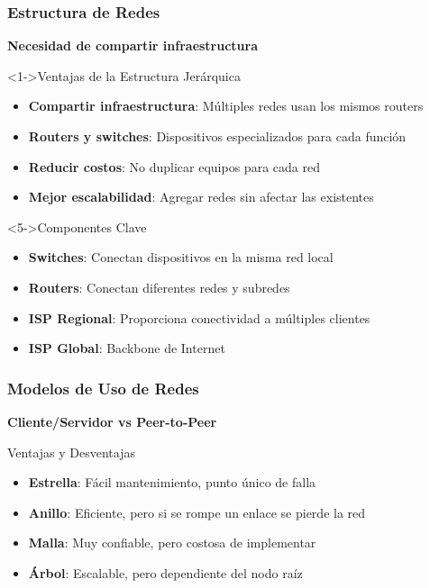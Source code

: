 \documentclass[aspectratio=169]{beamer}
\begin{document}
\begin{frame}
\frametitle{Estructura de Redes}

\begin{center}
\Large \textbf{Necesidad de compartir infraestructura}
\end{center}

\begin{block}<1->{Ventajas de la Estructura Jerárquica}
\begin{itemize}
\item<1-> \textbf{Compartir infraestructura}: Múltiples redes usan los mismos routers
\item<2-> \textbf{Routers y switches}: Dispositivos especializados para cada función
\item<3-> \textbf{Reducir costos}: No duplicar equipos para cada red
\item<4-> \textbf{Mejor escalabilidad}: Agregar redes sin afectar las existentes
\end{itemize}
\end{block}

\begin{block}<5->{Componentes Clave}
\begin{itemize}
\item<5-> \textbf{Switches}: Conectan dispositivos en la misma red local
\item<6-> \textbf{Routers}: Conectan diferentes redes y subredes
\item<7-> \textbf{ISP Regional}: Proporciona conectividad a múltiples clientes
\item<8-> \textbf{ISP Global}: Backbone de Internet
\end{itemize}
\end{block}
\end{frame}

\begin{frame}
\frametitle{Modelos de Uso de Redes}

\begin{center}
\Large \textbf{Cliente/Servidor vs Peer-to-Peer}
\end{center}

\begin{block}{Ventajas y Desventajas}
\begin{itemize}
\item \textbf{Estrella}: Fácil mantenimiento, punto único de falla
\item \textbf{Anillo}: Eficiente, pero si se rompe un enlace se pierde la red
\item \textbf{Malla}: Muy confiable, pero costosa de implementar
\item \textbf{Árbol}: Escalable, pero dependiente del nodo raíz
\end{itemize}
\end{block}
\end{frame}
\end{document}
